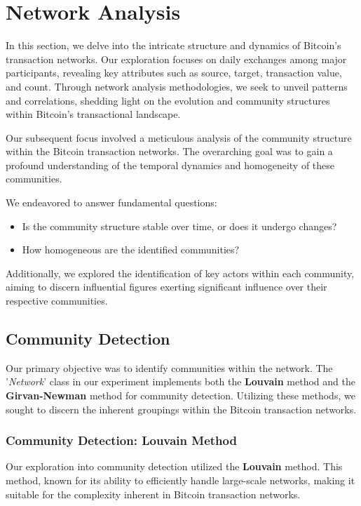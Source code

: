 \documentclass[a4paper, 12pt]{article}
\begin{document}
\section{Network Analysis}
In this section, we delve into the intricate structure and dynamics of Bitcoin's transaction networks. Our exploration focuses on daily exchanges among major participants, revealing key attributes such as source, target, transaction value, and count. Through network analysis methodologies, we seek to unveil patterns and correlations, shedding light on the evolution and community structures within Bitcoin's transactional landscape.

Our subsequent focus involved a meticulous analysis of the community structure within the Bitcoin transaction networks. The overarching goal was to gain a profound understanding of the temporal dynamics and homogeneity of these communities.

We endeavored to answer fundamental questions:
\begin{itemize}
    \item Is the community structure stable over time, or does it undergo changes?
    \item How homogeneous are the identified communities? \\
\end{itemize}

Additionally, we explored the identification of key actors within each community, aiming to discern influential figures exerting significant influence over their respective communities.

\subsection{Community Detection}

Our primary objective was to identify communities within the network. The '\textit{Network}' class in our experiment implements both the \textbf{Louvain} method and the \textbf{Girvan-Newman} method for community detection. Utilizing these methods, we sought to discern the inherent groupings within the Bitcoin transaction networks. 

\subsubsection{Community Detection: Louvain Method}

Our exploration into community detection utilized the \textbf{Louvain} method. This method, known for its ability to efficiently handle large-scale networks, making it suitable for the complexity inherent in Bitcoin transaction networks.
\end{document}
